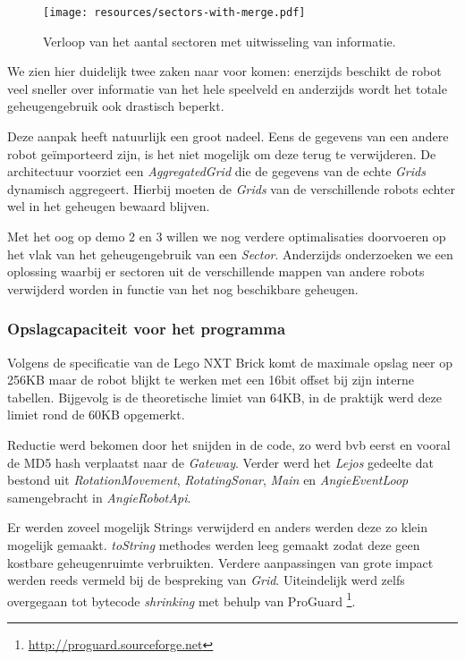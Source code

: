\documentclass[12pt,a4paper]{report}
\begin{document}
\begin{figure}[htbp]
  \centering
  \texttt{[image: resources/sectors-with-merge.pdf]}
  \caption{Verloop van het aantal sectoren met uitwisseling van informatie.}
  \label{chart:sectors-with-merge}
\end{figure}

We zien hier duidelijk twee zaken naar voor komen: enerzijds beschikt de robot veel sneller over informatie van het hele speelveld en anderzijds wordt het totale geheugengebruik ook drastisch beperkt.

Deze aanpak heeft natuurlijk een groot nadeel. Eens de gegevens van een andere robot ge\"importeerd zijn, is het niet mogelijk om deze terug te verwijderen. De architectuur voorziet een \emph{AggregatedGrid} die de gegevens van de echte \emph{Grids} dynamisch aggregeert. Hierbij moeten de \emph{Grids}  van de verschillende robots echter wel in het geheugen bewaard blijven.

Met het oog op demo 2 en 3 willen we nog verdere optimalisaties doorvoeren op het vlak van het geheugengebruik van een \emph{Sector}. Anderzijds onderzoeken we een oplossing waarbij er sectoren uit de verschillende mappen van andere robots verwijderd worden in functie van het nog beschikbare geheugen.

\subsubsection{Opslagcapaciteit voor het programma}

Volgens de specificatie van de Lego NXT Brick komt de maximale opslag neer op 256KB maar de robot blijkt te werken met een 16bit offset bij zijn interne tabellen. Bijgevolg is de theoretische limiet van 64KB, in de praktijk werd deze limiet rond de 60KB opgemerkt.

Reductie werd bekomen door het snijden in de code, zo werd bvb eerst en vooral de MD5 hash verplaatst naar de \emph{Gateway}. Verder werd het \emph{Lejos} gedeelte dat bestond uit \emph{RotationMovement}, \emph{RotatingSonar}, \emph{Main} en \emph{AngieEventLoop} samengebracht in \emph{AngieRobotApi}.

Er werden zoveel mogelijk Strings verwijderd en anders werden deze zo klein mogelijk gemaakt. \emph{toString} methodes werden leeg gemaakt zodat deze geen kostbare geheugenruimte verbruikten.  Verdere aanpassingen van grote impact werden reeds vermeld bij de bespreking van \emph{Grid}. Uiteindelijk werd zelfs overgegaan tot bytecode \emph{shrinking} met behulp van ProGuard \footnote{\url{http://proguard.sourceforge.net}}.
\end{document}
